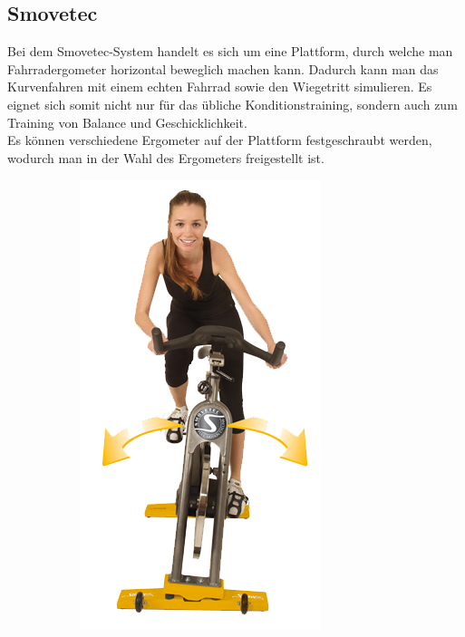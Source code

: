 \subsection{Smovetec}
Bei dem Smovetec-System handelt es sich um eine Plattform, durch welche man Fahrradergometer horizontal beweglich machen kann. Dadurch kann man das Kurvenfahren mit einem echten Fahrrad sowie den Wiegetritt simulieren. Es eignet sich somit nicht nur für das übliche Konditionstraining, sondern auch zum Training von Balance und Geschicklichkeit.\\
Es können verschiedene Ergometer auf der Plattform festgeschraubt werden, wodurch man in der Wahl des Ergometers freigestellt ist.
\begin{figure}[ht]
\centering
\begin{subfigure}{.4\textwidth}
\centering
\includegraphics[width=.8\textwidth]{gfx/smovetec.png}

\end{subfigure}
\end{figure}
